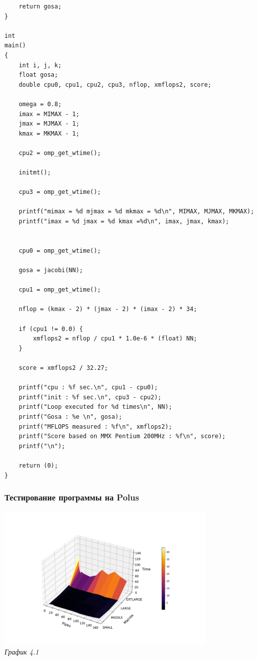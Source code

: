\documentclass[a4paper, 11pt]{article}
\begin{document}
\begin{lstlisting}
    return gosa;
}

int
main()
{
    int i, j, k;
    float gosa;
    double cpu0, cpu1, cpu2, cpu3, nflop, xmflops2, score;

    omega = 0.8;
    imax = MIMAX - 1;
    jmax = MJMAX - 1;
    kmax = MKMAX - 1;

    cpu2 = omp_get_wtime();
    
    initmt();
    
    cpu3 = omp_get_wtime();
    
    printf("mimax = %d mjmax = %d mkmax = %d\n", MIMAX, MJMAX, MKMAX);
    printf("imax = %d jmax = %d kmax =%d\n", imax, jmax, kmax);


    cpu0 = omp_get_wtime();

    gosa = jacobi(NN);

    cpu1 = omp_get_wtime();

    nflop = (kmax - 2) * (jmax - 2) * (imax - 2) * 34;

    if (cpu1 != 0.0) {
        xmflops2 = nflop / cpu1 * 1.0e-6 * (float) NN;
    }

    score = xmflops2 / 32.27;

    printf("cpu : %f sec.\n", cpu1 - cpu0);
    printf("init : %f sec.\n", cpu3 - cpu2);
    printf("Loop executed for %d times\n", NN);
    printf("Gosa : %e \n", gosa);
    printf("MFLOPS measured : %f\n", xmflops2);
    printf("Score based on MMX Pentium 200MHz : %f\n", score);
    printf("\n");

    return (0);
}
\end{lstlisting}
\newpage

\subsubsection*{Тестирование программы на Polus}
\begin{center}
    \includegraphics[width=0.8\textwidth]{../graph/task.pdf} \\
    \small \it
    График 4.1
\end{center}
\end{document}
